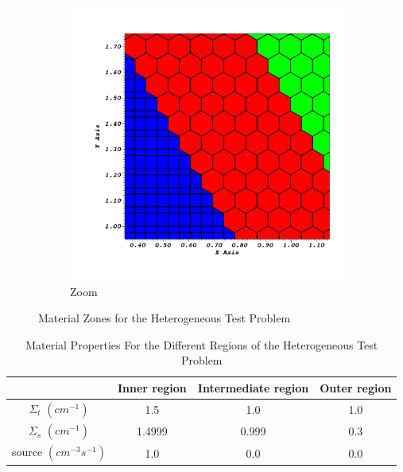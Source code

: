 \documentclass[preprint,10pt]{elsarticle}
\renewcommand{\(}{\left(}
\renewcommand{\)}{\right)}
\renewcommand{\[}{\left[}
\renewcommand{\]}{\right]}
\begin{document}
\begin{figure}[!htbp]
\begin{subfigure}{0.40\textwidth}
    \includegraphics[width=\textwidth]{hexa_grid0001}
    \caption{Zoom}
  \end{subfigure}
  \caption{Material Zones for the Heterogeneous Test Problem}
  \label{hex_zones}
\end{figure}
%
\begin{table}[!htbp]
  \begin{center}
    \caption{Material Properties For the Different Regions of the Heterogeneous Test Problem}
    \begin{tabular}{|c|c|c|c|}
      \hline
       & Inner region & Intermediate region & Outer region \\ \hline
      $\Sigma_t$ $(cm^{-1}) $ & 1.5 & 1.0 & 1.0 \\
      $\Sigma_s$ $(cm^{-1}) $ & 1.4999 & 0.999 & 0.3 \\
     source $(cm^{-3}s^{-1})$ & 1.0 & 0.0 & 0.0 \\
      \hline
    \end{tabular}
    \label{hex_prop}
  \end{center}
\end{table}
%
%
\end{document}
